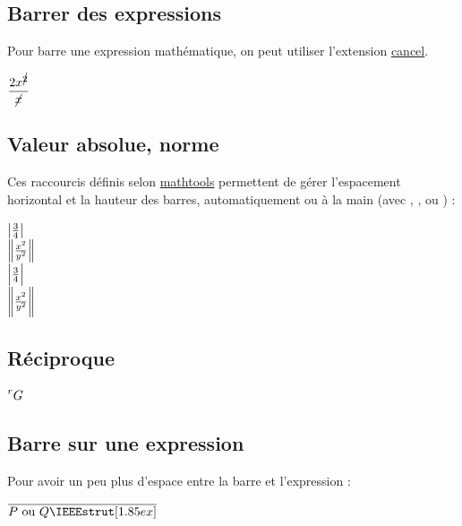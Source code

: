 \subsection{Barrer des expressions}

Pour barre une expression mathématique, on peut utiliser l'extension \href{http://mirror.ctan.org/macros/latex/contrib/cancel/cancel.pdf}{cancel}.

\begin{LTXexample}[pos=o,width=.3]
$\dfrac{2x^{\cancel{2}}}{\cancel{x}}$
\end{LTXexample}



\subsection{Valeur absolue, norme}

Ces raccourcis définis selon \href{http://mirror.ctan.org/macros/latex/contrib/mh/mathtools.pdf}{mathtools} permettent de gérer l'espacement horizontal et la hauteur des barres, automatiquement ou à la main (avec \inlatex{\big}, \inlatex{\Big}, \inlatex{\bigg} ou \inlatex{\Bigg}) :

\begin{LTXexample}[pos=o,width=.3]
$\abs*{\frac{3}{4}}$ \\[1ex]
$\norm*{\frac{x^2}{y^2}}$ \\[1ex]
$\abs[\Big]{\frac{3}{4}}$ \\[1ex]
$\norm[\bigg]{\frac{x^2}{y^2}}$
\end{LTXexample}



\subsection{Réciproque}

\begin{LTXexample}[pos=o,width=.3]
$\recip{G}$
\end{LTXexample}



\subsection{Barre sur une expression}

Pour avoir un peu plus d'espace entre la barre et l'expression :
\begin{LTXexample}[pos=o,width=.3]
$\ovline{P \text{ ou } Q}$
\end{LTXexample}

